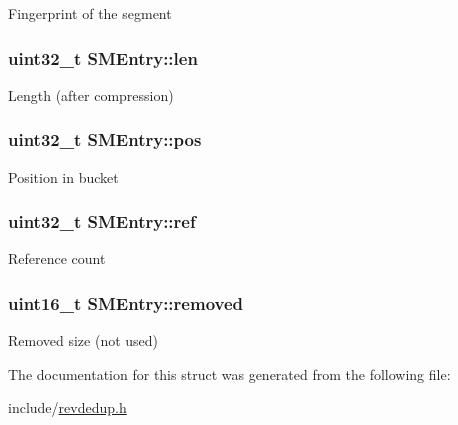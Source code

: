 \-Fingerprint of the segment \hypertarget{structSMEntry_a00e9a58c206ca0f7c7e048e0dee79e88}{
\subsubsection[{len}]{\setlength{\rightskip}{0pt plus 5cm}uint32\-\_\-t {\bf \-S\-M\-Entry\-::len}}}\label{structSMEntry_a00e9a58c206ca0f7c7e048e0dee79e88}
\-Length (after compression) \hypertarget{structSMEntry_a07ad56746a45bda3fd1398f4dfb0b71b}{
\subsubsection[{pos}]{\setlength{\rightskip}{0pt plus 5cm}uint32\-\_\-t {\bf \-S\-M\-Entry\-::pos}}}\label{structSMEntry_a07ad56746a45bda3fd1398f4dfb0b71b}
\-Position in bucket \hypertarget{structSMEntry_a924dca451023f2e5397765e59510b077}{
\subsubsection[{ref}]{\setlength{\rightskip}{0pt plus 5cm}uint32\-\_\-t {\bf \-S\-M\-Entry\-::ref}}}\label{structSMEntry_a924dca451023f2e5397765e59510b077}
\-Reference count \hypertarget{structSMEntry_a9c29e41b9d1bc3578c61e5d749a4877a}{
\subsubsection[{removed}]{\setlength{\rightskip}{0pt plus 5cm}uint16\-\_\-t {\bf \-S\-M\-Entry\-::removed}}}\label{structSMEntry_a9c29e41b9d1bc3578c61e5d749a4877a}
\-Removed size (not used) 

\-The documentation for this struct was generated from the following file\-:\begin{DoxyCompactItemize}
\item 
include/\hyperlink{revdedup_8h}{revdedup.\-h}\end{DoxyCompactItemize}
